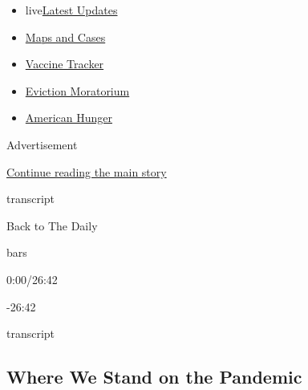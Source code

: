 \begin{itemize}
\tightlist
\item
  live\href{https://www.nytimes3xbfgragh.onion/2020/09/08/world/covid-19-coronavirus.html?name=styln-coronavirus-national\&region=TOP_BANNER\&block=storyline_menu_recirc\&action=click\&pgtype=Article\&impression_id=209f3f11-f1ea-11ea-82b9-9bc3e682e067\&variant=undefined}{Latest
  Updates}
\item
  \href{https://www.nytimes3xbfgragh.onion/interactive/2020/us/coronavirus-us-cases.html?name=styln-coronavirus-national\&region=TOP_BANNER\&block=storyline_menu_recirc\&action=click\&pgtype=Article\&impression_id=209f3f12-f1ea-11ea-82b9-9bc3e682e067\&variant=undefined}{Maps
  and Cases}
\item
  \href{https://www.nytimes3xbfgragh.onion/interactive/2020/science/coronavirus-vaccine-tracker.html?name=styln-coronavirus-national\&region=TOP_BANNER\&block=storyline_menu_recirc\&action=click\&pgtype=Article\&impression_id=209f3f13-f1ea-11ea-82b9-9bc3e682e067\&variant=undefined}{Vaccine
  Tracker}
\item
  \href{https://www.nytimes3xbfgragh.onion/2020/09/02/your-money/eviction-moratorium-covid.html?name=styln-coronavirus-national\&region=TOP_BANNER\&block=storyline_menu_recirc\&action=click\&pgtype=Article\&impression_id=209f3f14-f1ea-11ea-82b9-9bc3e682e067\&variant=undefined}{Eviction
  Moratorium}
\item
  \href{https://www.nytimes3xbfgragh.onion/interactive/2020/09/02/magazine/food-insecurity-hunger-us.html?name=styln-coronavirus-national\&region=TOP_BANNER\&block=storyline_menu_recirc\&action=click\&pgtype=Article\&impression_id=209f3f15-f1ea-11ea-82b9-9bc3e682e067\&variant=undefined}{American
  Hunger}
\end{itemize}

Advertisement

\protect\hyperlink{after-top}{Continue reading the main story}

transcript

Back to The Daily

bars

0:00/26:42

-26:42

transcript

\hypertarget{where-we-stand-on-the-pandemic}{%
\subsection{Where We Stand on the
Pandemic}\label{where-we-stand-on-the-pandemic}}

